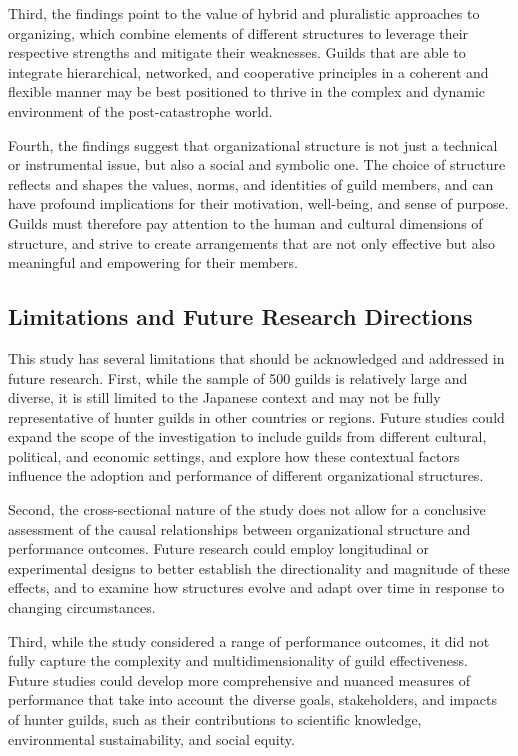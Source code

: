 \documentclass[12pt, a4paper]{article}
\begin{document}
Third, the findings point to the value of hybrid and pluralistic approaches to organizing, which combine elements of different structures to leverage their respective strengths and mitigate their weaknesses. Guilds that are able to integrate hierarchical, networked, and cooperative principles in a coherent and flexible manner may be best positioned to thrive in the complex and dynamic environment of the post-catastrophe world.

Fourth, the findings suggest that organizational structure is not just a technical or instrumental issue, but also a social and symbolic one. The choice of structure reflects and shapes the values, norms, and identities of guild members, and can have profound implications for their motivation, well-being, and sense of purpose. Guilds must therefore pay attention to the human and cultural dimensions of structure, and strive to create arrangements that are not only effective but also meaningful and empowering for their members.

\subsection{Limitations and Future Research Directions}
This study has several limitations that should be acknowledged and addressed in future research. First, while the sample of 500 guilds is relatively large and diverse, it is still limited to the Japanese context and may not be fully representative of hunter guilds in other countries or regions. Future studies could expand the scope of the investigation to include guilds from different cultural, political, and economic settings, and explore how these contextual factors influence the adoption and performance of different organizational structures.

Second, the cross-sectional nature of the study does not allow for a conclusive assessment of the causal relationships between organizational structure and performance outcomes. Future research could employ longitudinal or experimental designs to better establish the directionality and magnitude of these effects, and to examine how structures evolve and adapt over time in response to changing circumstances.

Third, while the study considered a range of performance outcomes, it did not fully capture the complexity and multidimensionality of guild effectiveness. Future studies could develop more comprehensive and nuanced measures of performance that take into account the diverse goals, stakeholders, and impacts of hunter guilds, such as their contributions to scientific knowledge, environmental sustainability, and social equity.
\end{document}
